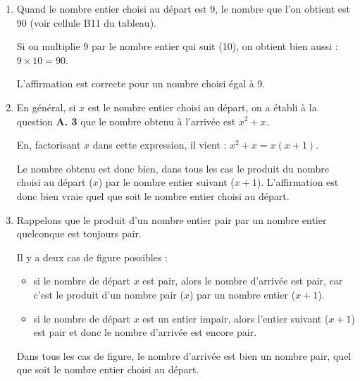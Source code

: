 \begin{enumerate}[resume]
\item Quand le nombre entier choisi au départ est 9, le nombre que l'on obtient est 90 (voir cellule B11 du tableau).

Si on multiplie 9 par le nombre entier qui suit (10), on obtient bien aussi : $9\times 10 = 90$.

L'affirmation est correcte pour un nombre choisi égal à 9.

\item En général, si $x$ est le nombre entier choisi au départ, on a établi à la question \textbf{A. 3} que le nombre obtenu à l'arrivée est $x^2 + x$.

En, factorisant $x$ dans cette expression, il vient : $x^2 + x = x (x + 1)$.

Le nombre obtenu est donc bien, dans tous les cas le produit du nombre choisi au départ ($x$) par le nombre entier suivant ($x+1$). L'affirmation est donc bien vraie quel que soit le nombre entier choisi au départ.

\item Rappelons que le produit d'un nombre entier pair par un nombre entier quelconque est toujours pair.

Il y a deux cas de figure possibles :
\begin{itemize}[label=$\bullet$~]
	\item si le nombre de départ $x$ est pair, alors le nombre d'arrivée est pair, car c'est le produit d'un nombre pair ($x$) par un nombre entier ($x+1$).
	\item si le nombre de départ $x$ est un entier impair, alors l'entier suivant ($x+1$) est pair et donc le nombre d'arrivée est encore pair.
\end{itemize}

Dans tous les cas de figure, le nombre d'arrivée est bien un nombre pair, quel que soit le nombre entier choisi au départ.
\end{enumerate}
